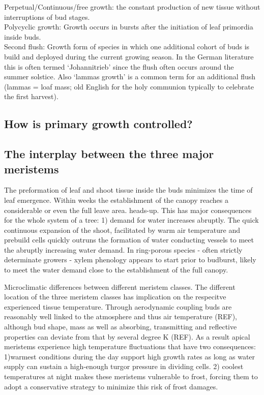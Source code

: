 \documentclass{article}
\begin{document}
	Perpetual/Continuous/free growth: the constant production of new tissue without interruptions of bud stages.\\
	Polycyclic growth: Growth occurs in bursts after the initiation of leaf primordia inside buds.  \\
	Second flush: Growth form of species in which one additional cohort of buds is build and deployed during the current growing season. In the German literature this is often termed ‘Johannitrieb’ since the flush often occurs around the summer solstice. Also ‘lammas growth’ is a common term for an additional flush (lammas = loaf mass; old English for the holy communion typically to celebrate the first harvest).\\
	
	\subsection*{How is primary growth controlled?}
	
		\subsection*{The interplay between the three major meristems}
		The preformation of leaf and shoot tissue inside the buds minimizes the time of leaf emergence. Within weeks the establishment of the canopy reaches a considerable or even the full leave area. heads-up. This has major consequences for the whole system of a tree: 1) demand for water increases abruptly. 
		The quick continuous expansion of the shoot, facilitated by warm air temperature and  prebuild cells quickly outruns the formation of water conducting vessels to meet the abruptly increasing water demand. 
		In ring-porous species - often strictly determinate growers - xylem phenology appears to start prior to budburst, likely to meet the water demand close to the establishment of the full canopy. 
		
		Microclimatic differences between different  meristem classes. 
		The different location of the three meristem classes has implication on the respecitve experienced tissue temperature. 
		Through aerodynamic coupling buds are reasonably well linked to the atmosphere and thus air temperature (REF), although bud shape, mass as well as absorbing, transmitting and reflective properties can deviate from that by several degree K (REF). As a result apical meristems experience high temperature fluctuations that have two consequences:  1)warmest conditions during the day support high growth rates as long as water supply can sustain a high-enough turgor pressure in dividing cells. 2) coolest temperatures at night makes these meristems vulnerable to frost, forcing them to adopt a conservative strategy to minimize this risk of frost damages.
		
\end{document}
